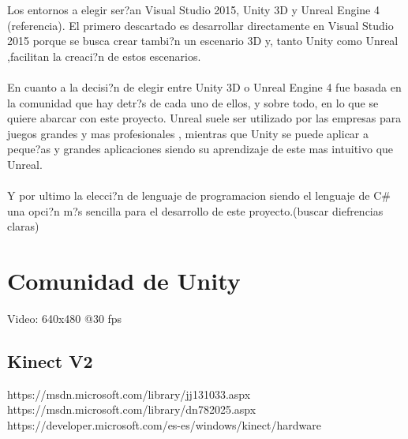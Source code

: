 Los entornos a elegir ser?an Visual Studio 2015, Unity 3D y Unreal Engine 4 (referencia). El primero descartado es desarrollar directamente en Visual Studio 2015 porque se busca crear tambi?n un escenario 3D y, tanto Unity como Unreal ,facilitan la creaci?n de estos escenarios.\\\\
En cuanto a la decisi?n de elegir entre Unity 3D o Unreal Engine 4 fue basada en la comunidad que hay detr?s de cada uno de ellos, y sobre todo, en lo que se quiere abarcar con este proyecto. Unreal suele ser utilizado por las empresas para juegos grandes y mas profesionales , mientras que Unity se puede aplicar a peque?as y grandes aplicaciones siendo su aprendizaje de este mas intuitivo que Unreal.
\\\\
Y por ultimo la elecci?n de lenguaje de programacion siendo el lenguaje de C\# una opci?n m?s sencilla para el desarrollo de este proyecto.(buscar diefrencias claras)


\section*{Comunidad de Unity}
 Video: 640x480 @30 fps
\subsection{Kinect V2}





\medskip
https://msdn.microsoft.com/library/jj131033.aspx\\
https://msdn.microsoft.com/library/dn782025.aspx\\
https://developer.microsoft.com/es-es/windows/kinect/hardware







